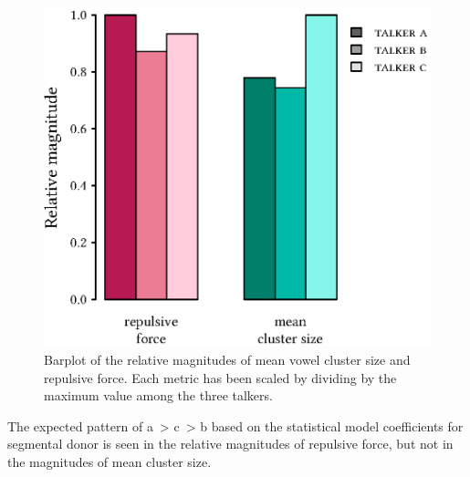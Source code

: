 \begin{figure}[bt]
	\begin{centering}
	\includegraphics{figures/posthocs/ForceCluster.eps}
	\caption[Barplot of vowel overlap and encroachment metrics]{Barplot of the relative magnitudes of mean vowel cluster size and repulsive force.  Each metric has been scaled by dividing by the maximum value among the three talkers.\label{fig:ForceCluster}}
	\end{centering}
\end{figure}

The expected pattern of \ac{a}~> \ac{c}~> \ac{b} based on the statistical model coefficients for segmental donor is seen in the relative magnitudes of repulsive force, but not in the magnitudes of mean cluster size.  %


